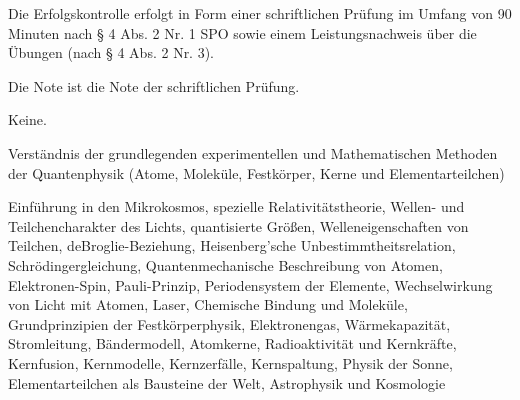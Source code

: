 \begin{course}

\setdoclanguagegerman
{}



\coursehead


\label{cour_8651.dp_997}


\begin{styleenv}
\begin{assessment}
Die Erfolgskontrolle erfolgt in Form einer schriftlichen Prüfung im Umfang von 90 Minuten nach § 4 Abs. 2 Nr. 1 SPO sowie einem Leistungsnachweis über die Übungen (nach § 4 Abs. 2 Nr. 3).

 

Die Note ist die Note der schriftlichen Prüfung.


\end{assessment}

\begin{conditions}Keine.\end{conditions}


\end{styleenv}

\begin{learningoutcomes}
Verständnis der grundlegenden experimentellen und Mathematischen Methoden der Quantenphysik (Atome, Moleküle, Festkörper, Kerne und Elementarteilchen)


\end{learningoutcomes}

\begin{content}
Einführung in den Mikrokosmos, spezielle Relativitätstheorie, Wellen- und Teilchencharakter des Lichts, quantisierte Größen, Welleneigenschaften von Teilchen, deBroglie-Beziehung, Heisenberg'sche Unbestimmtheitsrelation, Schrödingergleichung, Quantenmechanische Beschreibung von Atomen, Elektronen-Spin, Pauli-Prinzip, Periodensystem der Elemente, Wechselwirkung von Licht mit Atomen, Laser, Chemische Bindung und Moleküle, Grundprinzipien der Festkörperphysik, Elektronengas, Wärmekapazität, Stromleitung, Bändermodell, Atomkerne, Radioaktivität und Kernkräfte, Kernfusion, Kernmodelle, Kernzerfälle, Kernspaltung, Physik der Sonne, Elementarteilchen als Bausteine der Welt, Astrophysik und Kosmologie


\end{content}







\end{course}